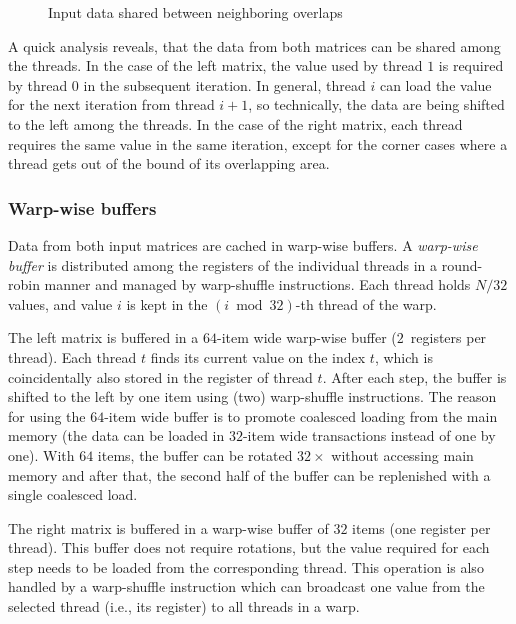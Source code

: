 \begin{figure}[ht]
	\centering
	\def\svgwidth{0.5\textwidth}
	\fontsize{8}{10}\selectfont
	
	\caption{Input data shared between neighboring overlaps}
	\label{fig:warp-shuffle-principle}
\end{figure}

A quick analysis reveals, that the data from both matrices can be shared among the threads. In the case of the left matrix, the value used by thread $1$ is required by thread $0$ in the subsequent iteration. In general, thread $i$ can load the value for the next iteration from thread $i+1$, so technically, the data are being shifted to the left among the threads. In the case of the right matrix, each thread requires the same value in the same iteration, except for the corner cases where a thread gets out of the bound of its overlapping area.


\subsubsection{Warp-wise buffers}

Data from both input matrices are cached in warp-wise buffers. A \emph{warp-wise buffer} is distributed among the registers of the individual threads in a round-robin manner and managed by warp-shuffle instructions. Each thread holds $N/32$ values, and value $i$ is kept in the $(i \bmod 32)$-th thread of the warp.

The left matrix is buffered in a $64$-item wide warp-wise buffer ($2$~registers per thread). Each thread $t$ finds its current value on the index $t$, which is coincidentally also stored in the register of thread $t$. After each step, the buffer is shifted to the left by one item using (two) warp-shuffle instructions. The reason for using the $64$-item wide buffer is to promote coalesced loading from the main memory (the data can be loaded in $32$-item wide transactions instead of one by one). With $64$ items, the buffer can be rotated $32\times$ without accessing main memory and after that, the second half of the buffer can be replenished with a single coalesced load.

The right matrix is buffered in a warp-wise buffer of $32$ items (one register per thread). This buffer does not require rotations, but the value required for each step needs to be loaded from the corresponding thread. This operation is also handled by a warp-shuffle instruction which can broadcast one value from the selected thread (i.e., its register) to all threads in a warp.

